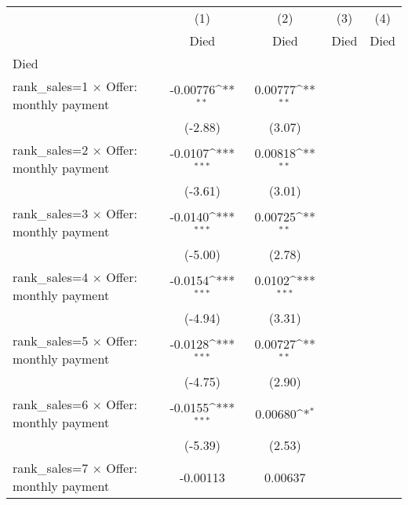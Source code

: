 {
\def\sym#1{\ifmmode^{#1}\else\(^{#1}\)\fi}
\begin{tabular}{l*{4}{c}}
\hline\hline
                    &\multicolumn{1}{c}{(1)}&\multicolumn{1}{c}{(2)}&\multicolumn{1}{c}{(3)}&\multicolumn{1}{c}{(4)}\\
                    &\multicolumn{1}{c}{Died}&\multicolumn{1}{c}{Died}&\multicolumn{1}{c}{Died}&\multicolumn{1}{c}{Died}\\
\hline
Died                &                     &                     &                     &                     \\
rank\_sales=1 $\times$ Offer: monthly payment&    -0.00776\sym{**} &     0.00777\sym{**} &                     &                     \\
                    &     (-2.88)         &      (3.07)         &                     &                     \\
rank\_sales=2 $\times$ Offer: monthly payment&     -0.0107\sym{***}&     0.00818\sym{**} &                     &                     \\
                    &     (-3.61)         &      (3.01)         &                     &                     \\
rank\_sales=3 $\times$ Offer: monthly payment&     -0.0140\sym{***}&     0.00725\sym{**} &                     &                     \\
                    &     (-5.00)         &      (2.78)         &                     &                     \\
rank\_sales=4 $\times$ Offer: monthly payment&     -0.0154\sym{***}&      0.0102\sym{***}&                     &                     \\
                    &     (-4.94)         &      (3.31)         &                     &                     \\
rank\_sales=5 $\times$ Offer: monthly payment&     -0.0128\sym{***}&     0.00727\sym{**} &                     &                     \\
                    &     (-4.75)         &      (2.90)         &                     &                     \\
rank\_sales=6 $\times$ Offer: monthly payment&     -0.0155\sym{***}&     0.00680\sym{*}  &                     &                     \\
                    &     (-5.39)         &      (2.53)         &                     &                     \\
rank\_sales=7 $\times$ Offer: monthly payment&    -0.00113         &     0.00637         &                     &                     \\

\end{tabular}}
